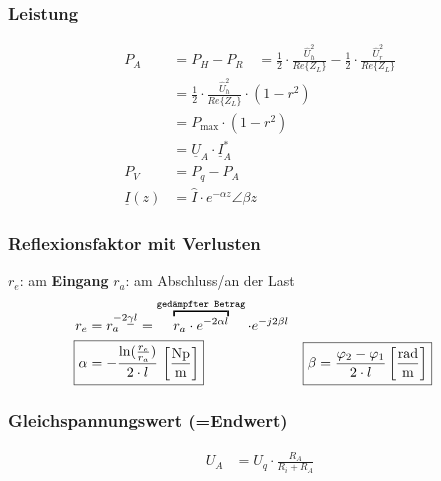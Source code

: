 \subsubsection{Leistung}
\begin{align*}
	P_{A}            & = P_{H}-P_{R}
	\quad = \frac{1}{2} \cdot \frac{\hat{U}_{h}^{2}}{Re\{Z_{L}\}}-\frac{1}{2} \cdot \frac{\hat{U}_{r}^{2}}{Re\{Z_{L}\}} \\
	                 & =\frac{1}{2} \cdot \frac{\hat{U}_{h}^{2}}{Re\{Z_{L}\}} \cdot\left(1-r^{2}\right)                 \\
	                 & = P_{\max} \cdot\left(1-r^{2}\right)                                                             \\
	                 & = \underline{U}_A\cdot\underline{I}_A^*                                                          \\
	P_V              & = P_q -P_A                                                                                       \\
	\underline{I}(z) & = \hat{I}\cdot e^{-\alpha z}\angle \beta z
\end{align*}

\subsubsection{Reflexionsfaktor mit Verlusten}
$ r_e $: am \textbf{Eingang} \qquad $ r_a $: am Abschluss/an der Last
\begin{align*}
	r_e            & = r_a  ^{-2\underline{\gamma} l} =  \overbracket{r_a \cdot e^{-2\alpha l}}^ \texttt{gedämpfter Betrag}   \cdot e^{-j2\beta l}                                                                                                     \\
	\Aboxed{\alpha & = -\frac{\ln(\frac{r_e}{r_a})}{2 \cdot l} \, \left[ \frac{\si{Np}}{\si{m}} \right]  }                                         & \Aboxed{\beta & = \dfrac{\varphi_2 -\varphi_1}{2\cdot l} \left[ \frac{\si{rad}}{\si{m}} \right] }
\end{align*}

\subsubsection{Gleichspannungswert (=Endwert)}
\begin{align*}
	U_A & = U_q\cdot\frac{R_A}{R_i+R_A}
\end{align*}


